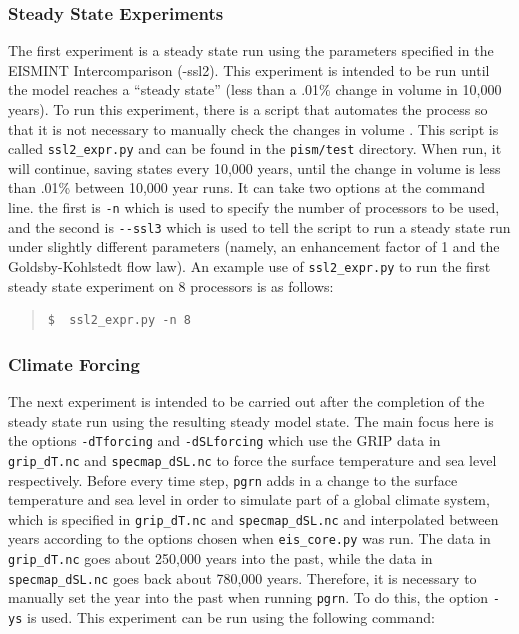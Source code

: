 \documentclass[11pt,final]{amsart}
\begin{document}
\subsubsection{Steady State Experiments}  The first experiment is a steady state run using the parameters specified in the EISMINT Intercomparison (-ssl2). This experiment is intended to be run until the model reaches a ``steady state'' (less than a .01\% change in volume in 10,000 years). To run this experiment, there is a script that automates the process so that it is not necessary to manually check the changes in volume . This script is called \verb|ssl2_expr.py| and can be found in the \verb|pism/test| directory. When run, it will continue, saving states every 10,000 years, until the change in volume is less than .01\% between 10,000 year runs. It can take two options at the command line. the first is \verb|-n| which is used to specify the number of processors to be used, and the second is \verb|--ssl3| which is used to tell the script to run a steady state run under slightly different parameters (namely, an enhancement factor of 1 and the Goldsby-Kohlstedt flow law).  An example use of \verb|ssl2_expr.py| to run the first steady state experiment on 8 processors is as follows:

\small\begin{quote}\begin{verbatim}
$  ssl2_expr.py -n 8
\end{verbatim}
\end{quote}\normalsize

\subsubsection{Climate Forcing}  The next experiment is intended to be carried out after the completion of the steady state run using the resulting steady model state. The main focus here is the options \verb|-dTforcing| and \verb|-dSLforcing| which use the GRIP data in \verb|grip_dT.nc| and \verb|specmap_dSL.nc| to force the surface temperature and sea level respectively. Before every time step, \verb|pgrn| adds in a change to the surface temperature and sea level in order to simulate part of a global climate system, which is specified in \verb|grip_dT.nc| and \verb|specmap_dSL.nc| and interpolated between years according to the options chosen when \verb|eis_core.py| was run. The data in \verb|grip_dT.nc| goes about 250,000 years into the past, while the data in \verb|specmap_dSL.nc| goes back about 780,000 years. Therefore, it is necessary to manually set the year into the past when running \verb|pgrn|. To do this, the option \verb|-ys| is used. This experiment can be run using the following command:
\end{document}
